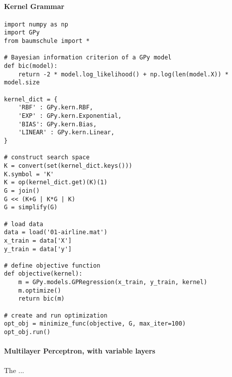 \documentclass[english]{article}
\begin{document}
\paragraph{Kernel Grammar}

\begin{verbatim}
import numpy as np
import GPy
from baumschule import *

# Bayesian information criterion of a GPy model
def bic(model):
    return -2 * model.log_likelihood() + np.log(len(model.X)) * model.size

kernel_dict = {
    'RBF' : GPy.kern.RBF,
    'EXP' : GPy.kern.Exponential,
    'BIAS': GPy.kern.Bias,
    'LINEAR' : GPy.kern.Linear,
}

# construct search space
K = convert(set(kernel_dict.keys()))
K.symbol = 'K'
K = op(kernel_dict.get)(K)(1)
G = join()
G << (K+G | K*G | K)
G = simplify(G)

# load data
data = load('01-airline.mat')
x_train = data['X']
y_train = data['y']

# define objective function
def objective(kernel):
    m = GPy.models.GPRegression(x_train, y_train, kernel)
    m.optimize()
    return bic(m)

# create and run optimization
opt_obj = minimize_func(objective, G, max_iter=100)
opt_obj.run()

\end{verbatim}


\paragraph{Multilayer Perceptron, with variable layers}
The ...
\end{document}
